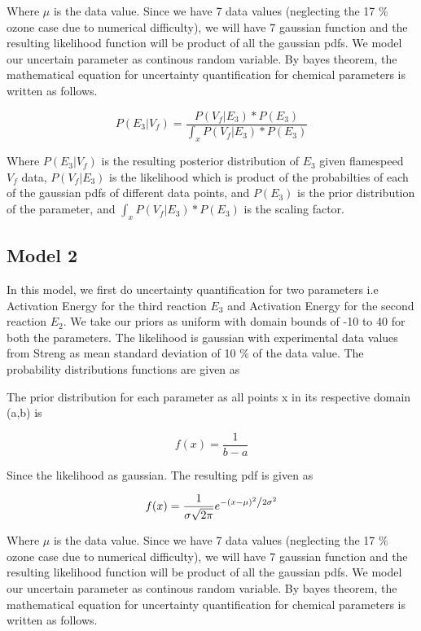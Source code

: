   
\noindent Where $\mu$ is the data value. Since we have 7 data values (neglecting the 17 \% ozone case due to numerical difficulty), we will have 7 gaussian function and the resulting likelihood function will be product of all the gaussian pdfs. We model our uncertain parameter as continous random variable. By bayes theorem, the mathematical equation for uncertainty quantification for chemical parameters is written as follows. 

 $$P( E_3 |V_f ) = \frac{P(V_f| E_3)*  P(E_3)}{\int_x P(V_f| E_3)* P(E_3)}$$ 
 
 \noindent Where  $P( E_3 |V_f ) $ is the resulting posterior distribution of $E_3$ given flamespeed $V_f$ data, $P(V_f| E_3)$ is the likelihood which is product of the probabilties of each of the gaussian pdfs of different data points, and $ P(E_3)$ is the prior distribution of the parameter, and $\int_x P(V_f|E_3)*P(E_3)$ is the scaling factor.
 

\subsection{Model 2}


\noindent In this model, we first do uncertainty quantification for two parameters i.e Activation Energy for the third reaction $E_3$ and Activation Energy for the second reaction $E_2$. We take our priors as uniform with domain bounds of -10 to 40 for both the parameters. The likelihood is gaussian with experimental data values from Streng\cite{Streng} as mean standard deviation of 10 \% of the data value. The probability distributions functions are given as

\noindent The prior distribution for each parameter as all points x in its respective domain (a,b) is 

$$f(x) = \frac{1}{b -a}$$


\noindent Since the likelihood as gaussian. The resulting pdf is given as 

$$f(x) = \frac{1}{{\sigma \sqrt {2\pi } }}e^{{{ - \left( {x - \mu } \right)^2 } \mathord{\left/ {\vphantom {{ - \left( {x - \mu } \right)^2 } {2\sigma ^2 }}} \right. \kern-\nulldelimiterspace} {2\sigma ^2 }}} $$

  
\noindent Where $\mu$ is the data value. Since we have 7 data values (neglecting the 17 \% ozone case due to numerical difficulty), we will have 7 gaussian function and the resulting likelihood function will be product of all the gaussian pdfs. We model our uncertain parameter as continous random variable. By bayes theorem, the mathematical equation for uncertainty quantification for chemical parameters is written as follows. 

